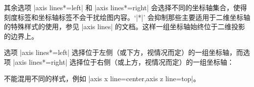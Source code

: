 {其余选项 |axis lines*=left| 和 |axis lines*=right| 会选择不同的坐标轴集合，使得刻度标签和坐标轴标签不会干扰绘图内容。`|*|' 会抑制那些主要适用于二维坐标轴的特殊样式的使用，参见 |axis lines| 的文档。这样一组坐标轴始终位于二维投影的边界上。

选项 |axis lines*=left| 选择位于左侧（或下方，视情况而定）的一组坐标轴，而选项 |axis lines*=right| 选择位于右侧（或上方，视情况而定）的一组坐标轴：

\begin{codeexample}[]
\end{codeexample}

\begin{codeexample}[]
\end{codeexample}

不能混用不同的样式，例如 |axis x line=center,axis z line=top|。

}
